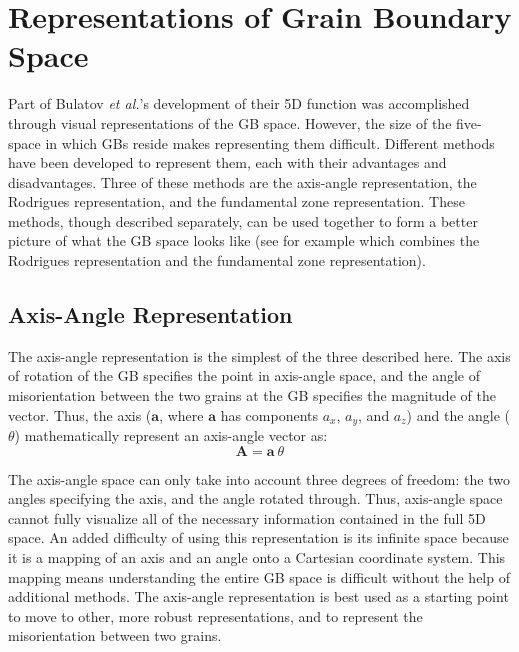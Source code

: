 \documentclass[twoside,senior]{BYUPhys}
\begin{document}
\section{Representations of Grain Boundary Space\label{methods:GBReps}}
Part of Bulatov \emph{et al.}'s development of their 5D function was accomplished through visual representations of the GB space.  However, the size of the five-space in which GBs reside makes representing them difficult.  Different methods have been developed to represent them, each with their advantages and disadvantages.  Three of these methods are the axis-angle representation, the Rodrigues representation, and the fundamental zone representation.  These methods, though described separately, can be used together to form a better picture of what the GB space looks like (see for example  which combines the Rodrigues representation and the fundamental zone representation).

\subsection{Axis-Angle Representation\label{GBReps:AA}}
The axis-angle representation is the simplest of the three described here.  The axis of rotation of the GB specifies the point in axis-angle space, and the angle of misorientation between the two grains at the GB specifies the magnitude of the vector.  Thus, the axis ($\bm{a}$, where $\bm{a}$ has components $a_x$, $a_y$, and $a_z$) and the angle ($\theta$) mathematically represent an axis-angle vector as:
\begin{equation}
\bm{A} = \bm{a}\ \theta
\label{eq:aaVec}
\end{equation} 

The axis-angle space can only take into account three degrees of freedom: the two angles specifying the axis, and the angle rotated through.  Thus, axis-angle space cannot fully visualize all of the necessary information contained in the full 5D space.\cite{frank1988} An added difficulty of using this representation is its infinite space because it is a mapping of an axis and an angle onto a Cartesian coordinate system.  This mapping means understanding the entire GB space is difficult without the help of additional methods.  The axis-angle representation is best used as a starting point to move to other, more robust representations, and to represent the misorientation between two grains.\cite{randle2000}
\end{document}
